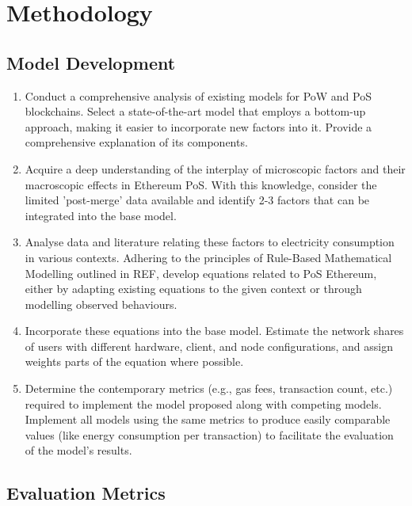 \chapter {Methodology}

\section{Model Development}
\begin{enumerate}
    \item Conduct a comprehensive analysis of existing models for PoW and PoS blockchains. Select a state-of-the-art model that employs a bottom-up approach, making it easier to incorporate new factors into it. Provide a comprehensive explanation of its components.

    \item Acquire a deep understanding of the interplay of microscopic factors and their macroscopic effects in Ethereum PoS. With this knowledge, consider the limited 'post-merge' data available and identify 2-3 factors that can be integrated into the base model.

    \item Analyse data and literature relating these factors to electricity consumption in various contexts. Adhering to the principles of Rule-Based Mathematical Modelling outlined in REF, develop equations related to PoS Ethereum, either by adapting existing equations to the given context or through modelling observed behaviours.

    \item Incorporate these equations into the base model. Estimate the network shares of users with different hardware, client, and node configurations, and assign weights parts of the equation where possible.

    \item Determine the contemporary metrics (e.g., gas fees, transaction count, etc.) required to implement the model proposed along with competing models. Implement all models using the same metrics to produce easily comparable values (like energy consumption per transaction) to facilitate the evaluation of the model's results.

\end{enumerate}

\section {Evaluation Metrics}

